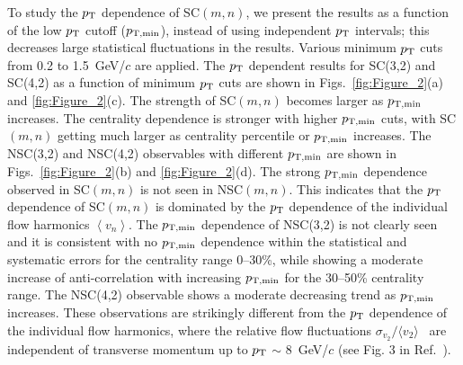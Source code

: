 To study the $p_{\rm T}$ dependence of SC$(m,n)$, we present the results as a function of the low $p_{\rm T}$ cutoff ($p_{\rm T, min}$), instead of using independent $p_{\rm T}$ intervals; this decreases large statistical fluctuations in the results. Various minimum $p_{\rm T}$ cuts from 0.2 to 1.5~GeV/$c$ are applied.
The $p_{\rm T}$ dependent results for SC(3,2) and SC(4,2) as a function of minimum $p_{\rm T}$ cuts are shown in Figs.~\ref{fig:Figure_2}(a) and \ref{fig:Figure_2}(c).
The strength of SC$(m,n)$ becomes larger as $p_{\rm T, min}$ increases. 
The centrality dependence is stronger with higher $p_{\rm T, min}$ cuts, with SC$(m,n)$ getting much larger as centrality percentile or $p_{\rm T, min}$ increases. 
The NSC(3,2) and NSC(4,2) observables with different $p_{\rm T, min}$ are shown in Figs.~\ref{fig:Figure_2}(b) and \ref{fig:Figure_2}(d).
The strong $p_{\rm T, min}$ dependence observed in SC$(m,n)$ is not seen in NSC$(m,n)$. 
This indicates that the $p_{\rm T}$ dependence of SC$(m,n)$ is dominated by the $p_{\rm T}$  dependence of the individual flow harmonics $\left<v_n\right>$. 
The $p_{\rm T, min}$ dependence of NSC(3,2) is not clearly seen and it is consistent with no $p_{\rm T, min}$ dependence within the statistical and systematic errors for the centrality range 0--30\%, while showing a moderate increase of anti-correlation with increasing $p_{\rm T, min}$ for the 30--50\% centrality range.
The NSC(4,2) observable shows a moderate decreasing trend as $p_{\rm T, min}$ increases. These observations are strikingly different from the $p_{\rm T}$ dependence of the individual flow harmonics, where the relative flow fluctuations $\sigma_{v_2}/\langle v_{2} \rangle$~\cite{Voloshin:2008dg} are independent of transverse momentum up to $p_{\rm T}$ $\sim$ 8~GeV/$c$ (see Fig. 3 in Ref.~\cite{Abelev:2012di}).

